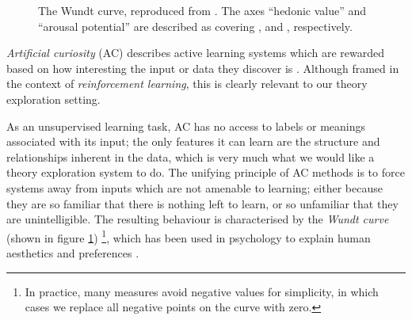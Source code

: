 \begin{figure}
  \centering

  \caption{The Wundt curve, reproduced from \citep{berlyne1970novelty}. The axes ``hedonic value'' and ``arousal potential'' are described as covering , and , respectively.}

  \label{wundt}
\end{figure}

\emph{Artificial curiosity} (AC) describes active learning systems which are rewarded based on how interesting the input or data they discover is \citep{schmidhuber2006developmental}. Although framed in the context of \emph{reinforcement learning}, this is clearly relevant to our theory exploration setting.

As an unsupervised learning task, AC has no access to labels or meanings associated with its input; the only features it can learn are the structure and relationships inherent in the data, which is very much what we would like a theory exploration system to do. The unifying principle of AC methods is to force systems away from inputs which are not amenable to learning; either because they are so familiar that there is nothing left to learn, or so unfamiliar that they are unintelligible. The resulting behaviour is characterised by the \emph{Wundt curve} (shown in figure \ref{wundt}) \footnote{In practice, many measures avoid negative values for simplicity, in which cases we replace all negative points on the curve with zero.}, which has been used in psychology to explain human aesthetics and preferences \citep{berlyne1970novelty}.

